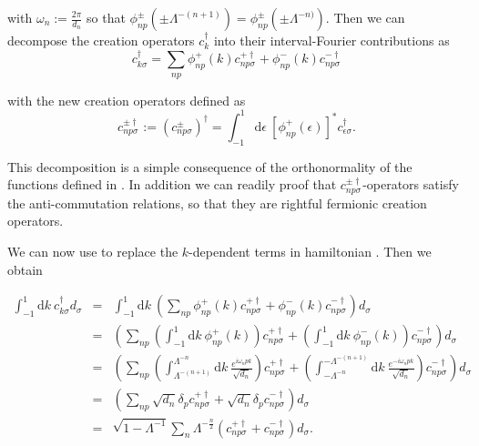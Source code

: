 with $\omega_{n}:=\frac{2\pi}{d_{n}}$ so that $\phi_{np}^{\pm}\left(\pm\Lambda^{-(n+1)}\right)=\phi_{np}^{\pm}\left(\pm\Lambda^{-n)}\right).$
Then we can decompose the creation operators $c_{k}^{\dagger}$ into
their interval-Fourier contributions as 
\begin{equation}
c_{k\sigma}^{\dagger}=\sum_{np}\phi_{np}^{+}(k)c_{np\sigma}^{+\dagger}+\phi_{np}^{-}(k)c_{np\sigma}^{-\dagger}\label{eq:Fourier-interval decomposition}
\end{equation}


with the new creation operators defined as 
\[
c_{np\sigma}^{\pm\dagger}:=\left(c_{np\sigma}^{\pm}\right)^{\dagger}=\int_{-1}^{1}\mbox{d}\epsilon\ \left[\phi_{np}^{+}(\epsilon)\right]^{*}c_{\epsilon\sigma}^{\dagger}.
\]


This decomposition 
is a simple consequence of the orthonormality of the functions defined
in . In addition we can readily
proof that $c_{np\sigma}^{\pm\dagger}$-operators satisfy the anti-commutation
relations, so that they are rightful fermionic creation operators. 

We can now use  to replace
the $k$-dependent terms in hamiltonian .
Then we obtain

\begin{eqnarray}
\int_{-1}^{1}\mbox{d}k\ c_{k\sigma}^{\dagger}d_{\sigma} & = & \int_{-1}^{1}\mbox{d}k\ \left(\sum_{np}\phi_{np}^{+}(k)c_{np\sigma}^{+\dagger}+\phi_{np}^{-}(k)c_{np\sigma}^{-\dagger}\right)d_{\sigma}\nonumber \\
 & = & \left(\sum_{np}\left(\int_{-1}^{1}\mbox{d}k\ \phi_{np}^{+}(k)\right)c_{np\sigma}^{+\dagger}+\left(\int_{-1}^{1}\mbox{d}k\ \phi_{np}^{-}(k)\right)c_{np\sigma}^{-\dagger}\right)d_{\sigma}\nonumber \\
 & = & \left(\sum_{np}\left(\int_{\Lambda^{-(n+1)}}^{\Lambda^{-n}}\mbox{d}k\ \frac{e^{i\omega_{n}pk}}{\sqrt{d_{n}}}\right)c_{np\sigma}^{+\dagger}+\left(\int_{-\Lambda^{-n}}^{-\Lambda^{-(n+1)}}\mbox{d}k\ \frac{e^{-i\omega_{n}pk}}{\sqrt{d_{n}}}\right)c_{np\sigma}^{-\dagger}\right)d_{\sigma}\nonumber \\
 & = & \left(\sum_{np}\sqrt{d_{n}}\delta_{p}c_{np\sigma}^{+\dagger}+\sqrt{d_{n}}\delta_{p}c_{np\sigma}^{-\dagger}\right)d_{\sigma}\nonumber \\
 & = & \sqrt{1-\Lambda^{-1}}\sum_{n}\Lambda^{-\frac{n}{2}}\left(c_{np\sigma}^{+\dagger}+c_{np\sigma}^{-\dagger}\right)d_{\sigma}.\label{eq:firt-Integral}
\end{eqnarray}



